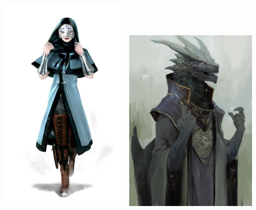 \documentclass[10pt,a4paper]{book}
\begin{document}
\includegraphics[width=0.49\textwidth]{mage 1}
\includegraphics[width=0.49\textwidth]{mage 2}
\end{document}
